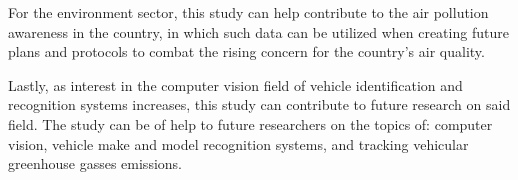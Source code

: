 For the environment sector, this study can help contribute to the air pollution awareness in the country, in which such data can be utilized when creating future plans and protocols to combat the rising concern for the country’s air quality.

Lastly, as interest in the computer vision field of vehicle identification and recognition systems increases, this study can contribute to future research on said field. The study can be of help to future researchers on the topics of: computer vision, vehicle make and model recognition systems, and tracking vehicular greenhouse gasses emissions.



\begin{comment}
If applicable, describe possible commercialization and/or innovation in your research.
\end{comment}


